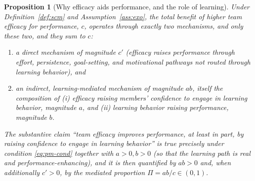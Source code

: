 \documentclass{amsart}
\newtheorem{proposition}{Proposition}
\theoremstyle{definition}
\begin{document}
\begin{proposition}[Why efficacy aids performance, and the role of learning]
\label{prop:mech}
Under Definition~\ref{def:scm} and Assumption~\ref{ass:exo}, the total benefit
of higher team efficacy for performance, $c$, operates through exactly two
mechanisms, and only these two, and they sum to $c$:
\begin{enumerate}
\item a \emph{direct} mechanism of magnitude $c'$ (efficacy raises performance
through effort, persistence, goal-setting, and motivational pathways not routed
through learning behavior), and
\item an \emph{indirect, learning-mediated} mechanism of magnitude $ab$, itself
the composition of (i) efficacy raising members' confidence to engage in
learning behavior, magnitude $a$, and (ii) learning behavior raising
performance, magnitude $b$.
\end{enumerate}
The substantive claim ``team efficacy improves performance, at least in part,
by raising confidence to engage in learning behavior'' is true precisely under
condition \eqref{eq:pm-cond} together with $a>0,b>0$ (so that the learning path
is real and performance-enhancing), and it is then quantified by $ab>0$ and,
when additionally $c'>0$, by the mediated proportion $\Pi=ab/c\in(0,1)$.
\end{proposition}
\end{document}
